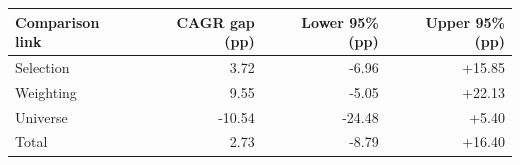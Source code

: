 \begin{tabular}{lrrr}
\toprule
Comparison link & CAGR gap (pp) & Lower 95\% (pp) & Upper 95\% (pp) \\
\midrule
Selection & 3.72 & -6.96 & +15.85 \\
Weighting & 9.55 & -5.05 & +22.13 \\
Universe & -10.54 & -24.48 & +5.40 \\
Total & 2.73 & -8.79 & +16.40 \\
\bottomrule
\end{tabular}

